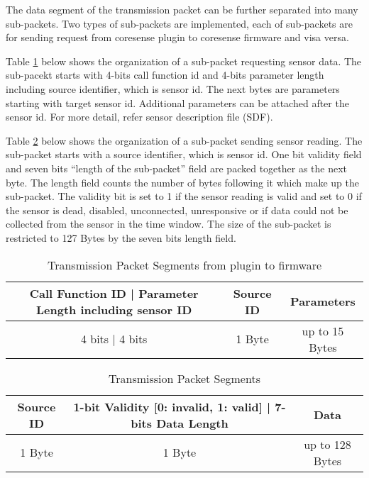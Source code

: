 The data segment of the transmission packet can be further separated into many sub-packets.
Two types of sub-packets are implemented, each of sub-packets are for sending request from coresense plugin to coresense firmware and visa versa.

Table \ref{table:toFW} below shows the organization of a sub-packet requesting sensor data.
The sub-pacekt starts with 4-bits call function id and 4-bits parameter length including source identifier, which is sensor id. The next bytes are parameters starting with target sensor id. Additional parameters can be attached after the sensor id. For more detail, refer sensor description file (SDF).

Table \ref{table:toPlugin} below shows the organization of a sub-packet sending sensor reading.
The sub-packet starts with a source identifier, which is sensor id. One bit validity field and seven bits ``length of the sub-packet'' field are packed together as the next byte. The length field counts the number of bytes following it which make up the sub-packet. 
The validity bit is set to 1 if the sensor reading is valid and set to 0 if the sensor is dead, disabled, unconnected, unresponsive or if data could not be collected
from the sensor in the time window. The size of the sub-packet is restricted to 127 Bytes by the seven bits length field.
\\



\begin{table}[H]
    \centering
    {
    \begin{tabular}{|c|c|c|}
        \hline
        \rowcolor{black!8}
        \textbf{Call Function ID | Parameter Length including sensor ID} & \bf{Source ID} & \textbf{Parameters} \\ \hline
        4 bits | 4 bits & 1 Byte & up to 15 Bytes \\
        \hline
    \end{tabular}
    }
    \caption{Transmission Packet Segments from plugin to firmware}
    \label{table:toFW}
\end{table}


\begin{table}[H]
    \centering
    {
    \begin{tabular}{|c|c|c|}
        \hline
        \rowcolor{black!8}
        \textbf{Source ID} & \bf{1-bit Validity [0: invalid, 1: valid] | 7-bits Data Length} & \textbf{Data} \\ \hline
        1 Byte & 1 Byte & up to 128 Bytes \\
        \hline
    \end{tabular}
    }
    \caption{Transmission Packet Segments}
    \label{table:toPlugin}
\end{table}



